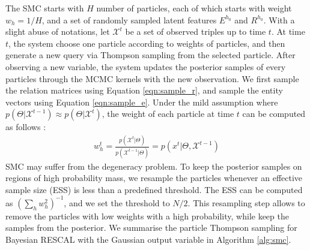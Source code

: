 The SMC starts with $H$ number of particles, each of which starts with weight $w_{h} = 1/H$, and a set of randomly sampled latent features $E^{h_0}$ and $R^{h_0}$. With a slight abuse of notations, let $\mathcal{X}^{t}$ be a set of observed triples up to time $t$. 
At time $t$, the system choose one particle according to weights of particles, 
and then generate a new query via Thompson sampling from the selected particle.
After observing a new variable, the system updates the posterior samples of 
every particles through the MCMC kernels with the new observation.
We first sample the relation matrices using Equation \ref{eqn:sample_r}, and sample the entity vectors using Equation \ref{eqn:sample_e}.
Under the mild assumption where 
$p(\Theta | \mathcal{X}^{t-1}) \approx p(\Theta | \mathcal{X}^{t})$, 
the weight of each particle at time $t$ can be computed as follows 
\cite{del2006sequential,chopin2002sequential}:
\begin{align}
w_{h}^{t} = \frac{p(\mathcal{X}^{t} | \Theta)}{p(\mathcal{X}^{t-1} | \Theta)}
 = p(x^{t} | \Theta, \mathcal{X}^{t-1})
\end{align}
SMC may suffer from the degeneracy problem. To keep the posterior samples
on regions of high probability mass, we resample the particles whenever 
an effective sample size (ESS) is less than a predefined threshold. 
The ESS can be computed as $(\sum_h w_h^2)^{-1}$, and we set the threshold 
to $N/2$. This resampling step allows to remove the particles with 
low weights with a high probability, while keep the samples from the posterior.
We summarise the particle Thompson sampling for Bayesian RESCAL with the Gaussian output variable in Algorithm \ref{alg:smc}.

%

